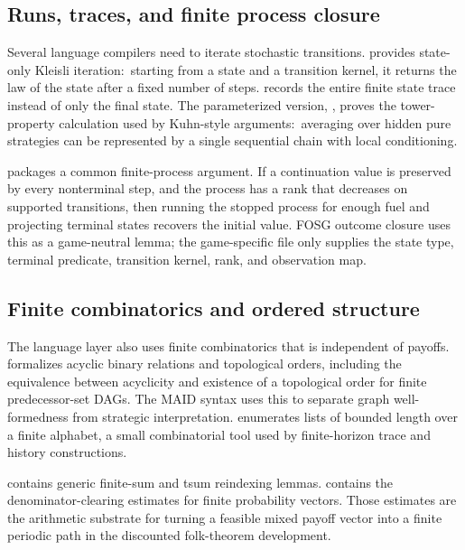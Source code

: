 \subsection{Runs, traces, and finite process closure}
\label{sec:math-layer:runs}

Several language compilers need to iterate stochastic transitions.
 provides state-only Kleisli iteration:\ starting
from a state and a transition kernel, it returns the law of the state
after a fixed number of steps.   records the entire
finite state trace instead of only the final state.  The
parameterized version, , proves the
tower-property calculation used by Kuhn-style arguments:\ averaging
over hidden pure strategies can be represented by a single sequential
chain with local conditioning.

 packages a common finite-process argument.
If a continuation value is preserved by every nonterminal step, and
the process has a rank that decreases on supported transitions, then
running the stopped process for enough fuel and projecting terminal
states recovers the initial value.  FOSG outcome closure uses this
as a game-neutral lemma; the game-specific file only supplies the
state type, terminal predicate, transition kernel, rank, and
observation map.

\subsection{Finite combinatorics and ordered structure}
\label{sec:math-layer:combinatorics}

The language layer also uses finite combinatorics that is independent
of payoffs.   formalizes acyclic binary relations and
topological orders, including the equivalence between acyclicity and
existence of a topological order for finite predecessor-set DAGs.
The MAID syntax uses this to separate graph well-formedness from
strategic interpretation.   enumerates lists of
bounded length over a finite alphabet, a small combinatorial tool
used by finite-horizon trace and history constructions.

 contains generic finite-sum and 
tsum reindexing lemmas.   contains
the denominator-clearing estimates for finite probability vectors.
Those estimates are the arithmetic substrate for turning a feasible
mixed payoff vector into a finite periodic path in the discounted
folk-theorem development.

